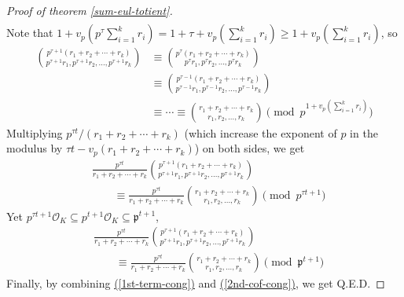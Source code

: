 \documentclass{treatise}
\begin{document}
\begin{proof}[Proof of theorem \ref*{sum-eul-totient}]
\begin{align*}
\end{align*}
Note that $1 + v_p \left( p^\tau \sum_{i = 1}^k r_i \right) = 1 + \tau + v_p \left( \sum_{i = 1}^k r_i \right) \geq 1 + v_p \left( \sum_{i = 1}^k r_i \right)$, so
\begin{align*}
{p^{\tau + 1}(r_1 + r_2 + \cdots + r_k) \choose p^{\tau + 1} r_1, p^{\tau + 1} r_2, \hdots, p^{\tau + 1} r_k} & \equiv {p^\tau(r_1 + r_2 + \cdots + r_k) \choose p^\tau r_1, p^\tau r_2, \hdots, p^\tau r_k}
\\
& \equiv {p^{\tau - 1}(r_1 + r_2 + \cdots + r_k) \choose p^{\tau - 1} r_1, p^{\tau - 1} r_2, \hdots, p^{\tau - 1} r_k}
\\
& \equiv \cdots \equiv {r_1 + r_2 + \cdots + r_k \choose r_1, r_2, \hdots, r_k} \pmod{p^{1 + v_p \left( \sum_{i = 1}^k r_i \right)}}
\end{align*}
Multiplying $p^{\tau t} / (r_1 + r_2 + \cdots + r_k)$ (which increase the exponent of $p$ in the modulus by $\tau t - v_p(r_1 + r_2 + \cdots + r_k)$) on both sides, we get
\begin{align*}
& \frac{p^{\tau t}}{r_1 + r_2 + \cdots + r_k} {p^{\tau + 1}(r_1 + r_2 + \cdots + r_k) \choose p^{\tau + 1} r_1, p^{\tau + 1} r_2, \hdots, p^{\tau + 1} r_k}
\\
& \qquad \equiv \frac{p^{\tau t}}{r_1 + r_2 + \cdots + r_k} {r_1 + r_2 + \cdots + r_k \choose r_1, r_2, \hdots, r_k} \pmod{p^{\tau t + 1}}
\end{align*}
Yet $p^{\tau t + 1} \mathcal{O}_K \subseteq p^{t + 1} \mathcal{O}_K \subseteq \mathfrak{p}^{t + 1}$,
\begin{align} \label{2nd-cof-cong}
& \frac{p^{\tau t}}{r_1 + r_2 + \cdots + r_k} {p^{\tau + 1}(r_1 + r_2 + \cdots + r_k) \choose p^{\tau + 1} r_1, p^{\tau + 1} r_2, \hdots, p^{\tau + 1} r_k} \nonumber
\\
& \qquad \equiv \frac{p^{\tau t}}{r_1 + r_2 + \cdots + r_k} {r_1 + r_2 + \cdots + r_k \choose r_1, r_2, \hdots, r_k} \pmod{\mathfrak{p}^{t + 1}}
\end{align}
Finally, by combining \hyperref[1st-term-cong]{(\ref*{1st-term-cong})} and \hyperref[2nd-cof-cong]{(\ref*{2nd-cof-cong})}, we get Q.E.D.
\end{proof}
\end{document}
